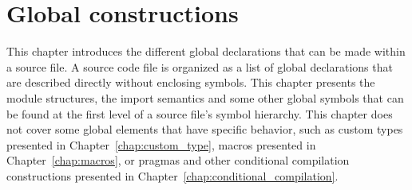 \pagecolor{gray!10!white}
\chapter{Global constructions}%
\label{chap:chap5}

This chapter introduces the different global declarations that can be made
within a source file. A source code file is organized as a list of global
declarations that are described directly without enclosing symbols. This chapter
presents the module structures, the import semantics and some other global
symbols that can be found at the first level of a source file's symbol
hierarchy. This chapter does not cover some global elements that have specific
behavior, such as custom types presented in Chapter~\ref{chap:custom_type},
macros presented in Chapter~\ref{chap:macros}, or pragmas and other conditional
compilation constructions presented in
Chapter~\ref{chap:conditional_compilation}.

\minitoc%







